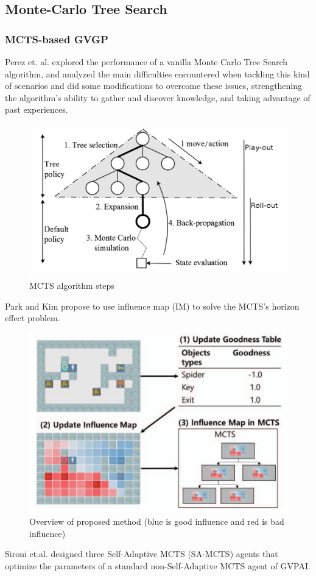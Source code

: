 \documentclass{beamer}
\begin{document}
\subsection{Monte-Carlo Tree Search}
\begin{frame}[allowframebreaks]
  \frametitle{MCTS-based GVGP}
  Perez et. al. \cite{8} explored the performance of a vanilla Monte Carlo Tree Search algorithm, and analyzed the main difficulties encountered when tackling this kind of scenarios and did some modifications to overcome these issues, strengthening the algorithm's ability to gather and discover knowledge, and taking advantage of past experiences.

  \begin{figure}[c]
    \includegraphics[width=0.6\linewidth]{figures/mctskb}
    \caption{ MCTS algorithm steps }
  \end{figure}

  Park and Kim\cite{9} propose to use influence map (IM) to solve
  the MCTS’s horizon effect problem.

  \begin{figure}[c]
    \includegraphics[width=0.6\linewidth]{figures/kim}
    \caption{ Overview of proposed method (blue is good influence and red is bad influence) }
  \end{figure}

  Sironi et.al.\cite{10} designed three Self-Adaptive MCTS (SA-MCTS) agents that optimize the parameters of a standard non-Self-Adaptive MCTS agent of GVPAI.


\end{frame}
\end{document}
